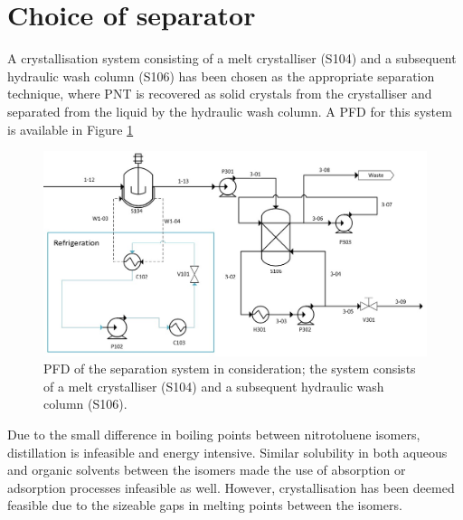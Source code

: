 \section{Choice of separator}
A crystallisation system consisting of a melt crystalliser (S104) and a subsequent hydraulic wash column (S106) has been chosen as the appropriate separation technique, where PNT is recovered as solid crystals from the crystalliser and separated from the liquid by the hydraulic wash column. A PFD for this system is available in Figure \ref{fig:separator PFD}


\begin{figure}[h]
    \centering
    \includegraphics[scale=0.6]{chapters/3-separation/figures/Crystallizer PFD.jpg}
    \caption{PFD of the separation system in consideration; the system consists of a melt crystalliser (S104) and a subsequent hydraulic wash column (S106).}
    \label{fig:separator PFD}
\end{figure}

Due to the small difference in boiling points between nitrotoluene isomers, distillation is infeasible and energy intensive. Similar solubility in both aqueous and organic solvents between the isomers made the use of absorption or adsorption processes infeasible as well. However, crystallisation has been deemed feasible due to the sizeable gaps in melting points between the isomers.


